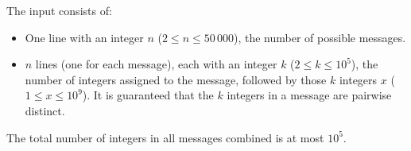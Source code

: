 
    The input consists of:
    \begin{itemize}
        \item One line with an integer $n$ ($2\leq n\leq 50\,000$), the number of possible messages.
        \item $n$ lines (one for each message),
            each with an integer $k$ ($2\leq k\leq 10^5$), the number of integers assigned to the message,
            followed by those $k$ integers $x$ ($1\leq x\leq 10^9$).
            It is guaranteed that the $k$ integers in a message are pairwise distinct.
    \end{itemize}
    The total number of integers in all messages combined is at most $10^5$.
